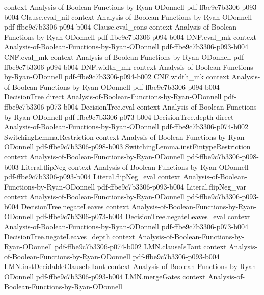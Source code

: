 \begin{lemma}
  {context}
  {Analysis-of-Boolean-Functions-by-Ryan-ODonnell}
  {pdf-ffbe9c7b3306-p093-b004}
\proofstep
  {Clause.eval_nil}
  {context}
  {Analysis-of-Boolean-Functions-by-Ryan-ODonnell}
  {pdf-ffbe9c7b3306-p094-b004}
\proofstep
  {Clause.eval_cons}
  {context}
  {Analysis-of-Boolean-Functions-by-Ryan-ODonnell}
  {pdf-ffbe9c7b3306-p094-b004}
\proofstep
  {DNF.eval_mk}
  {context}
  {Analysis-of-Boolean-Functions-by-Ryan-ODonnell}
  {pdf-ffbe9c7b3306-p093-b004}
\proofstep
  {CNF.eval_mk}
  {context}
  {Analysis-of-Boolean-Functions-by-Ryan-ODonnell}
  {pdf-ffbe9c7b3306-p094-b004}
\proofstep
  {DNF.width_mk}
  {context}
  {Analysis-of-Boolean-Functions-by-Ryan-ODonnell}
  {pdf-ffbe9c7b3306-p094-b002}
\proofstep
  {CNF.width_mk}
  {context}
  {Analysis-of-Boolean-Functions-by-Ryan-ODonnell}
  {pdf-ffbe9c7b3306-p094-b004}
\proofstep
  {DecisionTree}
  {direct}
  {Analysis-of-Boolean-Functions-by-Ryan-ODonnell}
  {pdf-ffbe9c7b3306-p073-b004}
\proofstep
  {DecisionTree.eval}
  {context}
  {Analysis-of-Boolean-Functions-by-Ryan-ODonnell}
  {pdf-ffbe9c7b3306-p073-b004}
\proofstep
  {DecisionTree.depth}
  {direct}
  {Analysis-of-Boolean-Functions-by-Ryan-ODonnell}
  {pdf-ffbe9c7b3306-p074-b002}
\proofstep
  {SwitchingLemma.Restriction}
  {context}
  {Analysis-of-Boolean-Functions-by-Ryan-ODonnell}
  {pdf-ffbe9c7b3306-p098-b003}
\proofstep
  {SwitchingLemma.instFintypeRestriction}
  {context}
  {Analysis-of-Boolean-Functions-by-Ryan-ODonnell}
  {pdf-ffbe9c7b3306-p098-b003}
\proofstep
  {Literal.flipNeg}
  {context}
  {Analysis-of-Boolean-Functions-by-Ryan-ODonnell}
  {pdf-ffbe9c7b3306-p093-b004}
\proofstep
  {Literal.flipNeg_eval}
  {context}
  {Analysis-of-Boolean-Functions-by-Ryan-ODonnell}
  {pdf-ffbe9c7b3306-p093-b004}
\proofstep
  {Literal.flipNeg_var}
  {context}
  {Analysis-of-Boolean-Functions-by-Ryan-ODonnell}
  {pdf-ffbe9c7b3306-p093-b004}
\proofstep
  {DecisionTree.negateLeaves}
  {context}
  {Analysis-of-Boolean-Functions-by-Ryan-ODonnell}
  {pdf-ffbe9c7b3306-p073-b004}
\proofstep
  {DecisionTree.negateLeaves_eval}
  {context}
  {Analysis-of-Boolean-Functions-by-Ryan-ODonnell}
  {pdf-ffbe9c7b3306-p073-b004}
\proofstep
  {DecisionTree.negateLeaves_depth}
  {context}
  {Analysis-of-Boolean-Functions-by-Ryan-ODonnell}
  {pdf-ffbe9c7b3306-p074-b002}
\proofstep
  {LMN.clauseIsTaut}
  {context}
  {Analysis-of-Boolean-Functions-by-Ryan-ODonnell}
  {pdf-ffbe9c7b3306-p093-b004}
\proofstep
  {LMN.instDecidableClauseIsTaut}
  {context}
  {Analysis-of-Boolean-Functions-by-Ryan-ODonnell}
  {pdf-ffbe9c7b3306-p093-b004}
\proofstep
  {LMN.mergeGates}
  {context}
  {Analysis-of-Boolean-Functions-by-Ryan-ODonnell}

\end{lemma}
